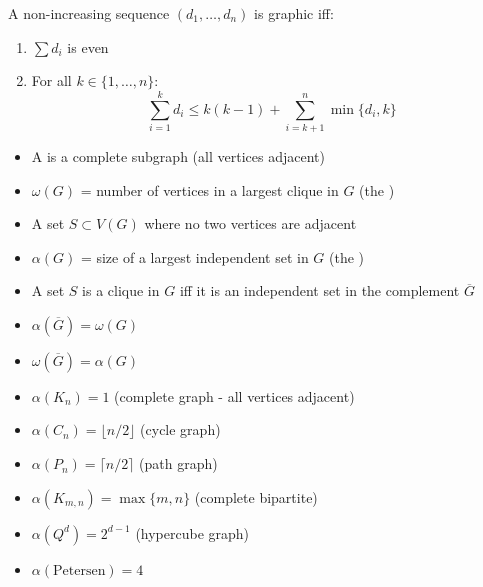 \documentclass[8pt,a4paper,landscape]{extarticle}
\begin{document}
\begin{cscolumns}
\begin{theorem}
A non-increasing sequence $(d_1,\dots,d_n)$ is graphic iff:
\begin{enumerate}[label=\arabic*.]
\item $\sum d_i$ is even
\item For all $k\in\{1,\dots,n\}$:
\[ \sum_{i=1}^{k}d_i\le k(k-1)+\sum_{i=k+1}^{n}\min\{d_i,k\} \]
\end{enumerate}
\end{theorem}

\begin{definition}
\begin{itemize}
\item A  is a complete subgraph (all vertices adjacent)
\item $\omega(G)$ = number of vertices in a largest clique in $G$ (the )
\end{itemize}
\end{definition}
\begin{definition}
\begin{itemize}
\item A set $S\subset V(G)$ where no two vertices are adjacent
\item $\alpha(G)$ = size of a largest independent set in $G$ (the )
\end{itemize}
\end{definition}
\begin{theorem}
\begin{itemize}
\item A set $S$ is a clique in $G$ iff it is an independent set in the complement $\overline{G}$
\item $\alpha(\overline{G})=\omega(G)$
\item $\omega(\overline{G})=\alpha(G)$
\end{itemize}
\end{theorem}

\begin{itemize}
\item $\alpha(K_n)=1$ (complete graph - all vertices adjacent)
\item $\alpha(C_n)=\lfloor n/2\rfloor$ (cycle graph)
\item $\alpha(P_n)=\lceil n/2\rceil$ (path graph)
\item $\alpha(K_{m,n})=\max\{m,n\}$ (complete bipartite)
\item $\alpha(Q^d)=2^{d-1}$ (hypercube graph)
\item $\alpha(\text{Petersen})=4$
\end{itemize}


\end{cscolumns}
\end{document}

